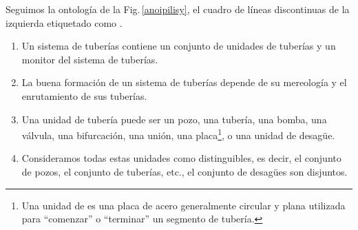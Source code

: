 
\label{pipe-ex1}\HHHH 

Seguimos la ontología de la Fig.\,\ref{anoipilisy}, el cuadro de líneas discontinuas de la izquierda
etiquetado como .


\mnewfoil

\HHHH


\mnewfoil

\HHHH
\begin{enumerate}\setei
\item \label{p-e-00} Un sistema de tuberías contiene un conjunto de unidades de tuberías y un monitor del sistema de tuberías.
\item \label{p-e--1} La buena formación de un sistema de tuberías
  depende de su mereología
  y el enrutamiento de sus tuberías. 
\item \label{p-e-01} Una unidad de tubería puede ser un pozo, una tubería, una bomba,
  una válvula, una bifurcación, una unión, una placa\footnote{\LLLL Una unidad de  es una
  placa de acero generalmente circular y plana utilizada para ``comenzar'' o ``terminar'' un
  segmento de tubería.}, o una unidad de desagüe.
\item \label{p-e-02} Consideramos todas estas unidades como
  distinguibles, es decir, el conjunto de pozos, el conjunto de tuberías, etc., el conjunto
  de desagües son disjuntos.
\savei\end{enumerate} 
\tehrantutorial{\end{multicols}}{}

